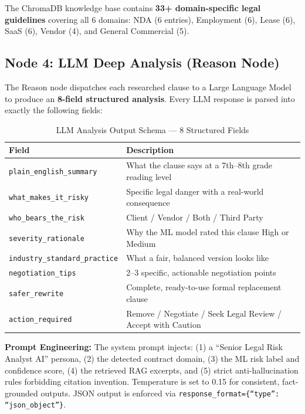 \documentclass[12pt,a4paper]{article}
\begin{document}
The ChromaDB knowledge base contains \textbf{33+ domain-specific legal guidelines}
covering all 6 domains: NDA (6 entries), Employment (6), Lease (6), SaaS (6),
Vendor (4), and General Commercial (5).

\subsection{Node 4: LLM Deep Analysis (Reason Node)}

The Reason node dispatches each researched clause to a Large Language Model to
produce an \textbf{8-field structured analysis}. Every LLM response is parsed into
exactly the following fields:

\begin{table}[h]
\centering
\begin{tabularx}{\textwidth}{lX}
\toprule
\textbf{Field} & \textbf{Description} \\
\midrule
\texttt{plain\_english\_summary} & What the clause says at a 7th--8th grade reading level \\
\texttt{what\_makes\_it\_risky} & Specific legal danger with a real-world consequence \\
\texttt{who\_bears\_the\_risk} & Client / Vendor / Both / Third Party \\
\texttt{severity\_rationale} & Why the ML model rated this clause High or Medium \\
\texttt{industry\_standard\_practice} & What a fair, balanced version looks like \\
\texttt{negotiation\_tips} & 2--3 specific, actionable negotiation points \\
\texttt{safer\_rewrite} & Complete, ready-to-use formal replacement clause \\
\texttt{action\_required} & Remove / Negotiate / Seek Legal Review / Accept with Caution \\
\bottomrule
\end{tabularx}
\caption{LLM Analysis Output Schema --- 8 Structured Fields}
\end{table}

\textbf{Prompt Engineering:} The system prompt injects: (1) a ``Senior Legal Risk
Analyst AI'' persona, (2) the detected contract domain, (3) the ML risk label and
confidence score, (4) the retrieved RAG excerpts, and (5) strict anti-hallucination
rules forbidding citation invention. Temperature is set to 0.15 for consistent,
fact-grounded outputs. JSON output is enforced via
\texttt{response\_format=\{``type'': ``json\_object''\}}.
\end{document}
